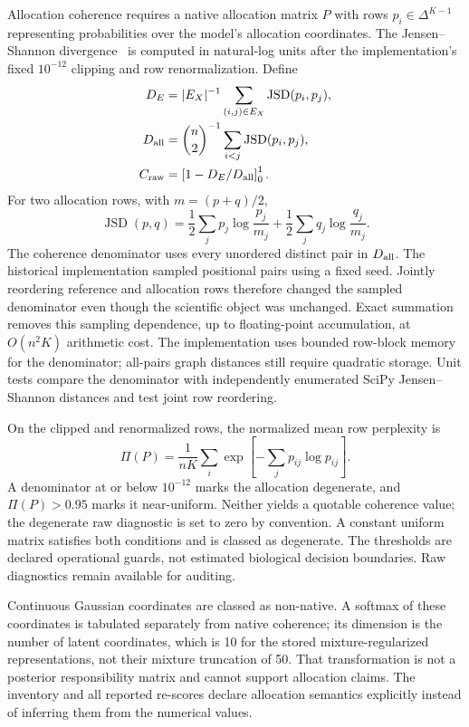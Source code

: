 \documentclass[11pt]{article}
\begin{document}
Allocation coherence requires a native allocation matrix $P$ with rows $p_i\in\Delta^{K-1}$ representing probabilities over the model's allocation coordinates. The Jensen--Shannon divergence~\cite{lin1991divergence} is computed in natural-log units after the implementation's fixed $10^{-12}$ clipping and row renormalization. Define
\begin{align}
 D_E &= |E_X|^{-1}\sum_{(i,j)\in E_X}\operatorname{JSD}(p_i,p_j),\\
 D_{\rm all} &= {\binom n2}^{-1}\sum_{i<j}\operatorname{JSD}(p_i,p_j),\\
 C_{\rm raw} &= \left[1-D_E/D_{\rm all}\right]_0^1.
\end{align}
For two allocation rows, with $m=(p+q)/2$,
\begin{equation}
 \operatorname{JSD}(p,q)=\frac12\sum_jp_j\log\frac{p_j}{m_j}
                         +\frac12\sum_jq_j\log\frac{q_j}{m_j}.
\end{equation}
The coherence denominator uses every unordered distinct pair in $D_{\rm all}$. The historical implementation sampled positional pairs using a fixed seed. Jointly reordering reference and allocation rows therefore changed the sampled denominator even though the scientific object was unchanged. Exact summation removes this sampling dependence, up to floating-point accumulation, at $O(n^2K)$ arithmetic cost. The implementation uses bounded row-block memory for the denominator; all-pairs graph distances still require quadratic storage. Unit tests compare the denominator with independently enumerated SciPy Jensen--Shannon distances and test joint row reordering.

On the clipped and renormalized rows, the normalized mean row perplexity is
\begin{equation}
 \Pi(P)=\frac{1}{nK}\sum_i\exp\!\left[-\sum_jp_{ij}\log p_{ij}\right].
\end{equation}
A denominator at or below $10^{-12}$ marks the allocation degenerate, and $\Pi(P)>0.95$ marks it near-uniform. Neither yields a quotable coherence value; the degenerate raw diagnostic is set to zero by convention. A constant uniform matrix satisfies both conditions and is classed as degenerate. The thresholds are declared operational guards, not estimated biological decision boundaries. Raw diagnostics remain available for auditing.

Continuous Gaussian coordinates are classed as non-native. A softmax of these coordinates is tabulated separately from native coherence; its dimension is the number of latent coordinates, which is 10 for the stored mixture-regularized representations, not their mixture truncation of 50. That transformation is not a posterior responsibility matrix and cannot support allocation claims. The inventory and all reported re-scores declare allocation semantics explicitly instead of inferring them from the numerical values.
\end{document}
